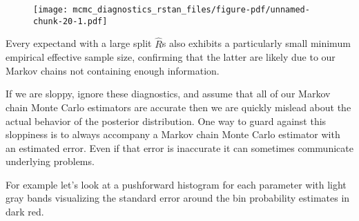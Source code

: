 \documentclass[
  letterpaper,
  DIV=11,
  numbers=noendperiod]{scrartcl}
\newenvironment{Shaded}{\begin{snugshade}}{\end{snugshade}}
\newcommand{\AttributeTok}[1]{\textcolor[rgb]{0.40,0.45,0.13}{#1}}
\newcommand{\DecValTok}[1]{\textcolor[rgb]{0.68,0.00,0.00}{#1}}
\newcommand{\FloatTok}[1]{\textcolor[rgb]{0.68,0.00,0.00}{#1}}
\newcommand{\FunctionTok}[1]{\textcolor[rgb]{0.28,0.35,0.67}{#1}}
\newcommand{\NormalTok}[1]{\textcolor[rgb]{0.00,0.23,0.31}{#1}}
\newcommand{\OtherTok}[1]{\textcolor[rgb]{0.00,0.23,0.31}{#1}}
\newcommand{\SpecialCharTok}[1]{\textcolor[rgb]{0.37,0.37,0.37}{#1}}
\newcommand{\StringTok}[1]{\textcolor[rgb]{0.13,0.47,0.30}{#1}}
\begin{document}
\begin{Shaded}
\end{Shaded}

\begin{figure}[H]

{\centering \texttt{[image: mcmc\_diagnostics\_rstan\_files/figure-pdf/unnamed-chunk-20-1.pdf]}

}

\end{figure}

Every expectand with a large split \(\hat{R}\)s also exhibits a
particularly small minimum empirical effective sample size, confirming
that the latter are likely due to our Markov chains not containing
enough information.

If we are sloppy, ignore these diagnostics, and assume that all of our
Markov chain Monte Carlo estimators are accurate then we are quickly
mislead about the actual behavior of the posterior distribution. One way
to guard against this sloppiness is to always accompany a Markov chain
Monte Carlo estimator with an estimated error. Even if that error is
inaccurate it can sometimes communicate underlying problems.

For example let's look at a pushforward histogram for each parameter
with light gray bands visualizing the standard error around the bin
probability estimates in dark red.
\end{document}
